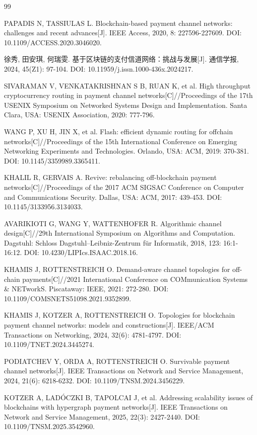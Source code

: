 \documentclass[UTF8,a4paper,twocolumn,fontset=none,zihao=5]{ctexart}
\begin{document}
\begin{thebibliography}{99}\small\raggedright\setlength{\itemsep}{2pt}

 PAPADIS N, TASSIULAS L. Blockchain-based payment channel networks: challenges and recent advances[J]. IEEE Access, 2020, 8: 227596-227609. DOI: 10.1109/ACCESS.2020.3046020.

 徐秀, 田安琪, 何瑞雯. 基于区块链的支付信道网络：挑战与发展[J]. 通信学报, 2024, 45(Z1): 97-104. DOI: 10.11959/j.issn.1000-436x.2024217.

 SIVARAMAN V, VENKATAKRISHNAN S B, RUAN K, et al. High throughput cryptocurrency routing in payment channel networks[C]//Proceedings of the 17th USENIX Symposium on Networked Systems Design and Implementation. Santa Clara, USA: USENIX Association, 2020: 777-796.

 WANG P, XU H, JIN X, et al. Flash: efficient dynamic routing for offchain networks[C]//Proceedings of the 15th International Conference on Emerging Networking Experiments and Technologies. Orlando, USA: ACM, 2019: 370-381. DOI: 10.1145/3359989.3365411.

 KHALIL R, GERVAIS A. Revive: rebalancing off-blockchain payment networks[C]//Proceedings of the 2017 ACM SIGSAC Conference on Computer and Communications Security. Dallas, USA: ACM, 2017: 439-453. DOI: 10.1145/3133956.3134033.

 AVARIKIOTI G, WANG Y, WATTENHOFER R. Algorithmic channel design[C]//29th International Symposium on Algorithms and Computation. Dagstuhl: Schloss Dagstuhl–Leibniz-Zentrum für Informatik, 2018, 123: 16:1-16:12. DOI: 10.4230/LIPIcs.ISAAC.2018.16.

 KHAMIS J, ROTTENSTREICH O. Demand-aware channel topologies for off-chain payments[C]//2021 International Conference on COMmunication Systems \& NETworkS. Piscataway: IEEE, 2021: 272-280. DOI: 10.1109/COMSNETS51098.2021.9352899.

 KHAMIS J, KOTZER A, ROTTENSTREICH O. Topologies for blockchain payment channel networks: models and constructions[J]. IEEE/ACM Transactions on Networking, 2024, 32(6): 4781-4797. DOI: 10.1109/TNET.2024.3445274.

 PODIATCHEV Y, ORDA A, ROTTENSTREICH O. Survivable payment channel networks[J]. IEEE Transactions on Network and Service Management, 2024, 21(6): 6218-6232. DOI: 10.1109/TNSM.2024.3456229.

 KOTZER A, LADÓCZKI B, TAPOLCAI J, et al. Addressing scalability issues of blockchains with hypergraph payment networks[J]. IEEE Transactions on Network and Service Management, 2025, 22(3): 2427-2440. DOI: 10.1109/TNSM.2025.3542960.


\end{thebibliography}
\end{document}
